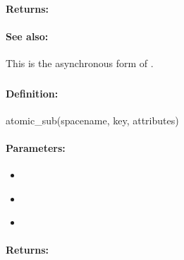 \paragraph{Returns:}


\paragraph{See also:}  This is the asynchronous form of .

\pagebreak
\subsubsection{}
\label{api:ruby:atomic_sub}


\paragraph{Definition:}
\begin{rubycode}
atomic_sub(spacename, key, attributes)
\end{rubycode}

\paragraph{Parameters:}
\begin{itemize}[noitemsep]
\item {}\\

\item {}\\

\item {}\\

\end{itemize}

\paragraph{Returns:}


\pagebreak
\subsubsection{}
\label{api:ruby:async_atomic_sub}


